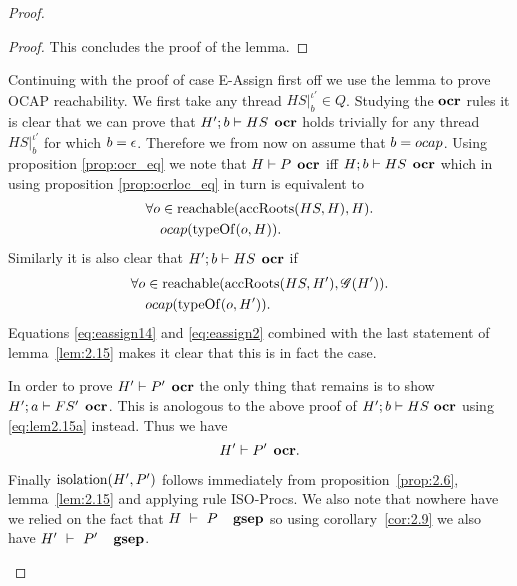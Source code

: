 \begin{proof}
\begin{description}
\begin{description}
\begin{description}
\begin{proof}
                This concludes the proof of the lemma.
              \end{proof}

              Continuing with the proof of case {\sc E-Assign} first off we use
              the lemma to prove OCAP reachability.  We first take any thread
              $HS|_b^{\iota'} \in Q$. Studying the $\mbox{\bf ocr}$ rules it is clear that we can
              prove that $H'; b \vdash HS \:\: \mbox{\bf ocr}$ holds trivially for any
              thread $HS|_b^{\iota'}$ for which $b = \mbox{$\epsilon$}$. Therefore we from now on
              assume that $b = \mbox{$ocap$}$.  Using proposition \ref{prop:ocr_eq} we
              note that $H \vdash P \:\: \mbox{\bf ocr}$ iff $H;b \vdash HS \:\:
              \mbox{\bf ocr}$ which in using proposition \ref{prop:ocrloc_eq} in turn is
              equivalent to  
              \begin{equation}\label{eq:eassign14}
                \begin{aligned}
                  \forall o &\in \mbox{$\mathrm{reachable}$}(\mbox{$\mathrm{accRoots}$}(HS, H), H). \\
                            &\mbox{$ocap$}(\mbox{$\mathrm{typeOf}$}(o, H)).
                \end{aligned}
              \end{equation}
              Similarly it is also clear that $H';b \vdash HS \:\: \mbox{\bf ocr}$ if
              \begin{equation}
                \begin{aligned}
                  \forall o &\in \mbox{$\mathrm{reachable}$}(\mbox{$\mathrm{accRoots}$}(HS, H'), \mathscr{G}(H')). \\
                            &\mbox{$ocap$}(\mbox{$\mathrm{typeOf}$}(o, H')).
                \end{aligned}
              \end{equation}
              Equations \eqref{eq:eassign14} and \eqref{eq:eassign2} combined
              with the last statement of lemma~\ref{lem:2.15}  makes it clear
              that this is in fact the case.

              In order to prove $H' \vdash P' \:\: \mbox{\bf ocr}$ the only thing that
              remains is to show $H';a \vdash FS' \:\: \mbox{\bf ocr}$. This is anologous
              to the above proof of $H';b \vdash HS~\mbox{\bf ocr}$ using
              \eqref{eq:lem2.15a} instead. Thus we have
              \begin{equation*}
                H' \vdash P' \:\: \mbox{\bf ocr}.
              \end{equation*}

              Finally $\mbox{$\mathrm{isolation}$}(H', P')$ follows immediately from
              proposition~\ref{prop:2.6}, lemma~\ref{lem:2.15} and applying rule
              {\sc ISO-Procs}. We also note that nowhere have we relied on the
              fact that $H~\vdash~P~\:\:~\mbox{\bf gsep}$ so using
              corollary~\ref{cor:2.9} we also have $H'~\vdash~P'~\:\:~\mbox{\bf gsep}$.


\end{description}
\end{description}
\end{description}
\end{proof}
